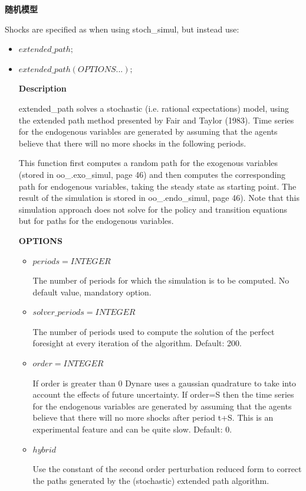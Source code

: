 \documentclass[10pt,math=newtx,citestyle=gb7714-2015,bibstyle=gb7714-2015]{elegantbook}
\begin{document}
{\begin{itemize}
\end{itemize}


\textbf{随机模型}

Shocks are specified as when using stoch\_simul, but instead use:

\begin{itemize}
	\item $extended\_path;$
	\item $extended\_path(OPTIONS...);$
	
	\textbf{Description}
	
	extended\_path solves a stochastic (i.e. rational expectations) model, using the extended path method presented by Fair and Taylor (1983). Time series for the endogenous variables are generated by assuming that the agents believe that there will no more shocks in the following periods.
	
	This function first computes a random path for the exogenous variables (stored in oo\_.exo\_simul, page 46) and then computes the corresponding path for endogenous variables, taking the steady state as starting point. The result of the simulation is stored in oo\_.endo\_simul, page 46). Note that this simulation approach does not solve for the policy and transition equations but for paths for the endogenous variables.
	
	\textbf{OPTIONS}
	\begin{itemize}
		\item $periods = INTEGER$
		
		The number of periods for which the simulation is to be computed. No default value, mandatory option.
		
		\item $solver\_periods = INTEGER$
		
		The number of periods used to compute the solution of the perfect foresight at every iteration of the algorithm. Default: 200.
		
		\item $order = INTEGER$
		
		If order is greater than 0 Dynare uses a gaussian quadrature to take into account the effects of future uncertainty. If order=S then the time series for the endogenous variables are generated by assuming that the agents believe that there will no more shocks after period t+S. This is an experimental feature and can be quite slow. Default: 0.
		
		\item $hybrid$
		
		Use the constant of the second order perturbation reduced form to correct the paths generated by the (stochastic) extended path algorithm.
	\end{itemize}
	

\end{itemize}}
\end{document}
